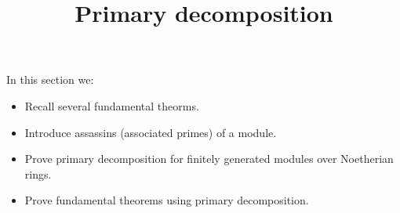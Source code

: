 \documentclass{ximera}
\title{Primary decomposition}
\begin{document}
\begin{abstract}
\end{abstract}

\maketitle

In this section we:

\begin{itemize}
\item Recall several fundamental theorms.
\item Introduce assassins (associated primes) of a module.
\item Prove primary decomposition for finitely generated modules over
  Noetherian rings.
\item Prove fundamental theorems using primary decomposition.
\end{itemize}
\end{document}

